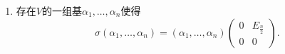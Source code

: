 \begin{exercise}
\begin{exgroup}[2]
\begin{enumerate}
            \item 存在$V$的一组基$\alpha_1,\ldots,\alpha_n$使得
                  \[\sigma(\alpha_1,\ldots,\alpha_n)=(\alpha_1,\ldots,\alpha_n)\begin{pmatrix}
                          0 & E_{\frac{n}{2}} \\ 0 & 0
                      \end{pmatrix}.\]
        \end{enumerate}
    \end{exgroup}


\end{exercise}
